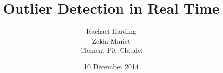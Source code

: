 \documentclass{vldb}
\begin{document}

\title{Outlier Detection in Real Time}



%
%
%
%


\author{
%
%
\alignauthor
Rachael Harding\\
\alignauthor
Zelda Mariet\\
\alignauthor
Clement Pit--Claudel\\
}
\date{10 December 2014}
\end{document}
